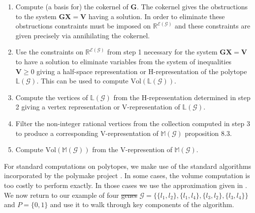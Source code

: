 \documentclass[10pt]{article}
\providecommand{\DIFaddtex}[1]{{\protect\color{blue}\uwave{#1}}} %
\providecommand{\DIFdeltex}[1]{{\protect\color{red}\sout{#1}}}                      %
\providecommand{\DIFaddbegin}{} %
\providecommand{\DIFaddend}{} %
\providecommand{\DIFdelbegin}{} %
\providecommand{\DIFdelend}{} %
\providecommand{\DIFadd}[1]{\texorpdfstring{\DIFaddtex{#1}}{#1}} %
\providecommand{\DIFdel}[1]{\texorpdfstring{\DIFdeltex{#1}}{}} %
\begin{document}
\begin{enumerate}
\item Compute (a basis for) the cokernel of $\mathbf{G}$. The cokernel gives the obstructions to the system $\mathbf{G}\mathbf{X}=\mathbf{V}$ having a solution. In order to eliminate these obstructions constraints must be imposed on $\mathbb{R}^{\mathcal{E}(\mathcal{G})}$ and these constraints are given precisely via annihilating the cokernel.
\item Use the constraints on $\mathbb{R}^{\mathcal{E}(\mathcal{G})}$ from step 1 necessary for the system $\mathbf{G}\mathbf{X}=\mathbf{V}$ to have a solution to eliminate variables from the system of inequalities $\mathbf{V} \geq 0$ giving a half-space representation or H-representation of the polytope $\mathbb{L}(\mathcal{G})$. This can be used to compute $\text{Vol}(\mathbb{L}(\mathcal{G}))$.
\item Compute the vertices of $\mathbb{L}(\mathcal{G})$ from the H-representation determined in step 2 giving a vertex representation or V-representation of $\mathbb{L}(\mathcal{G})$.
\item Filter the non-integer rational vertices from the collection computed in step 3 to produce a corresponding V-representation of $\mathbb{M}(\mathcal{G})$ \cite{Wainwright2007} proposition 8.3.
\item Compute $\text{Vol}(\mathbb{M}(\mathcal{G}))$ from the V-represention of $\mathbb{M}(\mathcal{G})$.
\end{enumerate}

For standard computations on polytopes, we make use of the standard algorithms incorporated by the polymake project \cite{Gawrilow2000}. In some cases, the volume computation is too costly to perform exactly. In those cases we use the approximation given in \cite{Cousins}.  We now return to our example of four \DIFdelbegin \DIFdel{genes }\DIFdelend \DIFaddbegin \DIFadd{variables }\DIFaddend $\mathcal{G} = \{\{l_1,l_2 \},\{l_1,l_4 \},\{l_3,l_2\},\{l_3,l_4\} \}$ and $P=\{0,1\}$ and use it to walk through key components of the algorithm.
\end{document}
